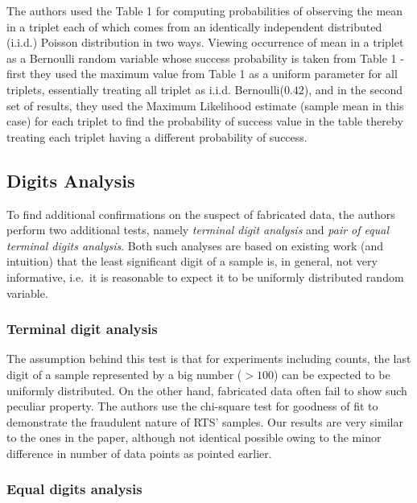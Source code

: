 \documentclass{article}
\begin{document}
The authors used the Table 1 for computing probabilities of observing the mean in a triplet each of which comes from an identically independent distributed (i.i.d.) Poisson distribution in two ways. Viewing occurrence of mean in a triplet as a Bernoulli random variable whose success probability is taken from Table 1 - first they used the maximum value from Table 1 as a uniform parameter for all triplets, essentially treating all triplet as i.i.d. Bernoulli($0.42$), and in the second set of results, they used the Maximum Likelihood estimate (sample mean in this case) for each triplet to find the probability of success value in the table thereby treating each triplet having a different probability of success.



    \subsection{Digits Analysis}\label{digits-analysis}

To find additional confirmations on the suspect of fabricated data, the
authors perform two additional tests, namely \textit{terminal
digit analysis} and \textit{pair of equal terminal digits analysis}. Both
such analyses are based on existing work (and intuition) that the least significant digit of a sample is, in general, not very informative, i.e.~it is reasonable to expect it to be uniformly distributed random variable.



\subsubsection{Terminal digit analysis}\label{terminal-digit-analysis}

The assumption behind this test is that for experiments including
counts, the last digit of a sample represented by a big number
($>100$) can be expected to be uniformly distributed. On the
other hand, fabricated data often fail to show such peculiar property.
The authors use the chi-square test for goodness of fit to demonstrate
the fraudulent nature of RTS' samples. Our results are very similar to
the ones in the paper, although not identical possible owing to the minor difference in number of data points as pointed earlier.

\subsubsection{Equal digits analysis}\label{equal-digits-analysis}
\end{document}
